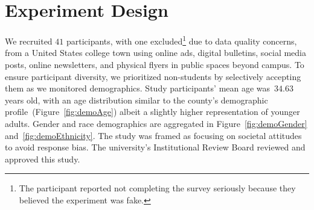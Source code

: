 \section{Experiment Design}
\label{sec:experiment}
We recruited $41$ participants, with one excluded\footnote{The participant reported not completing the survey seriously because they believed the experiment was fake.} due to data quality concerns, from a United States college town using online ads, digital bulletins, social media posts, online newsletters, and physical flyers in public spaces beyond campus. To ensure participant diversity, we prioritized non-students by selectively accepting them as we monitored demographics. Study participants' mean age was~$34.63$ years old, with an age distribution similar to the county's demographic profile~(Figure~\ref{fig:demoAge}) albeit a slightly higher representation of younger adults. Gender and race demographics are aggregated in Figure~\ref{fig:demoGender} and~\ref{fig:demoEthnicity}. The study was framed as focusing on societal attitudes to avoid response bias. The university's Institutional Review Board reviewed and approved this study. 

